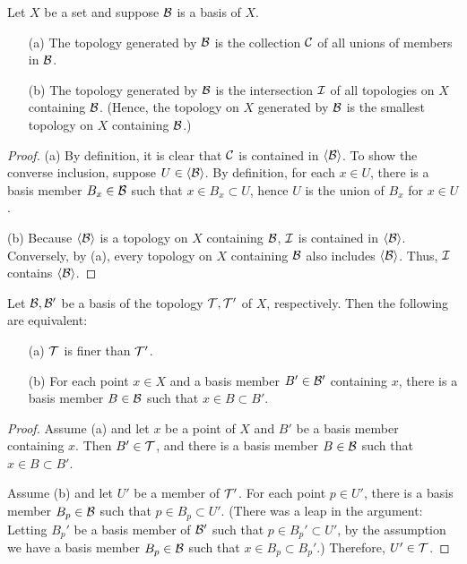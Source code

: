 \begin{obs}
    Let $X$ be a set and suppose ${\mathcal{B}}$ is a basis of $X$.
    \begin{enumerate}
        \item[(a)]
        {
            The topology generated by ${\mathcal{B}}$ is the collection ${\mathcal{C}}$ of all unions of members in ${\mathcal{B}}$.
        }
        \item[(b)]
        {
            The topology generated by ${\mathcal{B}}$ is the intersection ${\mathcal{I}}$ of all topologies on $X$ containing ${\mathcal{B}}$. (Hence, the topology on $X$ generated by ${\mathcal{B}}$ is the smallest topology on $X$ containing ${\mathcal{B}}$.)
        }
    \end{enumerate}
\end{obs}
\begin{proof}
    \hangindent=0.65cm
    (a)
    By definition, it is clear that ${\mathcal{C}}$ is contained in ${\left\langle{{\mathcal{B}}}\right\rangle}$.
    To show the converse inclusion, suppose $U\in{\left\langle{{\mathcal{B}}}\right\rangle}$.
    By definition, for each $x\in U$, there is a basis member $B_x\in{\mathcal{B}}$ such that $x\in B_x\subset U$, hence $U$ is the union of $B_x$ for $x\in U$.

    \noindent(b)
    Because ${\left\langle{{\mathcal{B}}}\right\rangle}$ is a topology on $X$ containing ${\mathcal{B}}$, ${\mathcal{I}}$ is contained in ${\left\langle{{\mathcal{B}}}\right\rangle}$.
    Conversely, by (a), every topology on $X$ containing ${\mathcal{B}}$ also includes ${\left\langle{{\mathcal{B}}}\right\rangle}$.
    Thus, ${\mathcal{I}}$ contains ${\left\langle{{\mathcal{B}}}\right\rangle}$.
\end{proof}

\begin{lem}
    Let ${\mathcal{B}}, {\mathcal{B}}'$ be a basis of the topology ${\mathcal{T}}, {\mathcal{T}}'$ of $X$, respectively.
    Then the following are equivalent:
    \begin{enumerate}
        \item[(a)]
        {
            ${\mathcal{T}}$ is finer than ${\mathcal{T}}'$.
        }
        \item[(b)]
        {
            For each point $x\in X$ and a basis member $B'\in{\mathcal{B}}'$ containing $x$, there is a basis member $B\in{\mathcal{B}}$ such that $x\in B\subset B'$.
        }
    \end{enumerate}
\end{lem}
\begin{proof}
    Assume (a) and let $x$ be a point of $X$ and $B'$ be a basis member containing $x$.
    Then $B'\in{\mathcal{T}}$, and there is a basis member $B\in{\mathcal{B}}$ such that $x\in B\subset B'$.

    Assume (b) and let $U'$ be a member of ${\mathcal{T}}'$.
    For each point $p\in U'$, there is a basis member $B_p\in{\mathcal{B}}$ such that $p\in B_p\subset U'$.
    (There was a leap in the argument: Letting $B_p'$ be a basis member of ${\mathcal{B}}'$ such that $p\in B_p'\subset U'$, by the assumption we have a basis member $B_p\in{\mathcal{B}}$ such that $x\in B_p\subset B_p'$.)
    Therefore, $U'\in{\mathcal{T}}$.
\end{proof}

